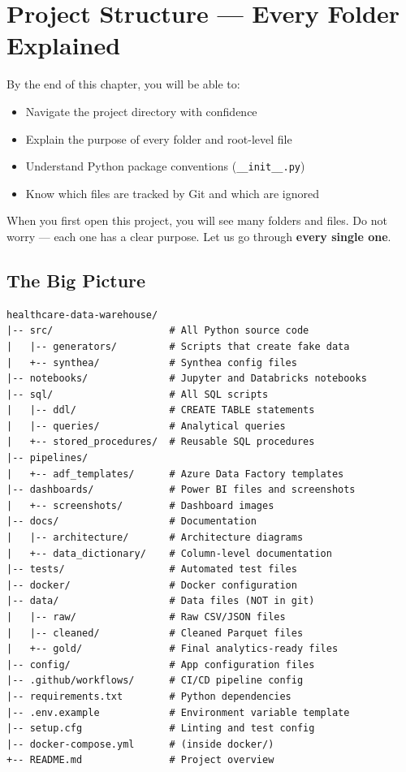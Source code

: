 \documentclass[12pt, a4paper, oneside]{report}
\begin{document}
\chapter{Project Structure --- Every Folder Explained}
\label{ch:structure}

\begin{objectivebox}
By the end of this chapter, you will be able to:
\begin{itemize}
    \item Navigate the project directory with confidence
    \item Explain the purpose of every folder and root-level file
    \item Understand Python package conventions (\texttt{\_\_init\_\_.py})
    \item Know which files are tracked by Git and which are ignored
\end{itemize}
\end{objectivebox}

When you first open this project, you will see many folders and files. Do not worry --- each one has a clear purpose. Let us go through \textbf{every single one}.

\section{The Big Picture}

\begin{lstlisting}[style=bashstyle, caption={Complete project directory tree}]
healthcare-data-warehouse/
|-- src/                    # All Python source code
|   |-- generators/         # Scripts that create fake data
|   +-- synthea/            # Synthea config files
|-- notebooks/              # Jupyter and Databricks notebooks
|-- sql/                    # All SQL scripts
|   |-- ddl/                # CREATE TABLE statements
|   |-- queries/            # Analytical queries
|   +-- stored_procedures/  # Reusable SQL procedures
|-- pipelines/
|   +-- adf_templates/      # Azure Data Factory templates
|-- dashboards/             # Power BI files and screenshots
|   +-- screenshots/        # Dashboard images
|-- docs/                   # Documentation
|   |-- architecture/       # Architecture diagrams
|   +-- data_dictionary/    # Column-level documentation
|-- tests/                  # Automated test files
|-- docker/                 # Docker configuration
|-- data/                   # Data files (NOT in git)
|   |-- raw/                # Raw CSV/JSON files
|   |-- cleaned/            # Cleaned Parquet files
|   +-- gold/               # Final analytics-ready files
|-- config/                 # App configuration files
|-- .github/workflows/      # CI/CD pipeline config
|-- requirements.txt        # Python dependencies
|-- .env.example            # Environment variable template
|-- setup.cfg               # Linting and test config
|-- docker-compose.yml      # (inside docker/)
+-- README.md               # Project overview
\end{lstlisting}
\end{document}
